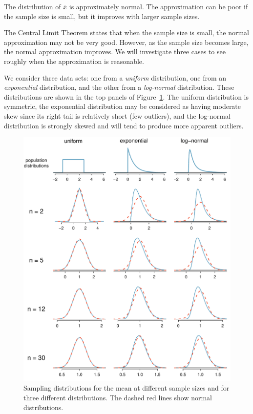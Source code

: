 \begin{termBox}{
The distribution of $\bar{x}$ is approximately normal. The approximation can be poor if the sample size is small, but it improves with larger sample sizes.}
\end{termBox}

The Central Limit Theorem states that when the sample size is small, the normal approximation may not be very good. However, as the sample size becomes large, the normal approximation improves. We will investigate three cases to see roughly when the approximation is reasonable.

We consider three data sets: one from a \emph{uniform} distribution, one from an \emph{exponential} distribution, and the other from a \emph{log-normal} distribution. These distributions are shown in the top panels of Figure~\ref{cltSimulations}. The uniform distribution is symmetric, the exponential distribution may be considered as having moderate skew since its right tail is relatively short (few outliers), and the log-normal distribution is strongly skewed and will tend to produce more apparent outliers.

\begin{figure}
   \centering
   \includegraphics[width=\textwidth]{ch_inference_foundations/figures/cltSimulations/cltSimulations}
   \caption{Sampling distributions for the mean at different sample sizes and for three different distributions. The dashed red lines show normal distributions.}
   \label{cltSimulations}
\end{figure}


